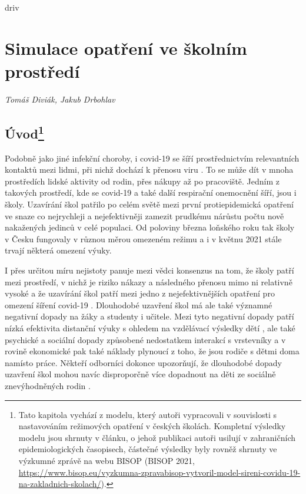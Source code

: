 driv
\chapter{Simulace opatření ve školním prostředí}\label{Skoly}

\textit{Tomáš Diviák, Jakub Drbohlav}
\vspace{15mm}

\section*{Úvod\footnote{Tato kapitola vychází z modelu, který autoři vypracovali v souvislosti s nastavováním režimových opatření v českých školách. Kompletní výsledky modelu jsou shrnuty v článku, o jehož publikaci autoři usilují v zahraničních epidemiologických časopisech, částečné výsledky byly rovněž shrnuty ve výzkumné zprávě na webu BISOP (BISOP 2021, \url{https://www.bisop.eu/vyzkumna-zpravabisop-vytvoril-model-sireni-covidu-19-na-zakladnich-skolach/}).}}

Podobně jako jiné infekční choroby, i covid-19 se šíří prostřednictvím relevantních kontaktů mezi lidmi, při nichž dochází k přenosu viru \cite{pg:kucharski2020, vespignani2020modelling}. To se může dít v mnoha prostředích lidské aktivity od rodin, přes nákupy až po pracoviště. Jedním z takových prostředí, kde se covid-19 a také další respirační onemocnění šíří, jsou i školy. Uzavírání škol patřilo po celém světě mezi první protiepidemická opatření ve snaze co nejrychleji a nejefektivněji zamezit prudkému nárůstu počtu nově nakažených jedinců v celé populaci. Od poloviny března loňského roku tak školy v Česku fungovaly v různou měrou omezeném režimu a i v květnu 2021 stále trvají některá omezení výuky.

I přes určitou míru nejistoty panuje mezi vědci konsenzus na tom, že školy patří mezi prostředí, v nichž je riziko nákazy a následného přenosu mimo ni relativně vysoké a že uzavírání škol patří mezi jedno z nejefektivnějších opatření pro omezení šíření covid-19 \cite{Brauner_etal2020, lessler2021household, Haug_etal2020}. Dlouhodobé uzavření škol má ale také významné negativní dopady na žáky a studenty i učitele. Mezi tyto negativní dopady patří nízká efektivita distanční výuky s ohledem na vzdělávací výsledky dětí \cite{engzell2021learning}, ale také psychické a sociální dopady způsobené nedostatkem interakcí s vrstevníky \cite{bignardi2020longitudinal, ravens2021impact} a v rovině ekonomické pak také náklady plynoucí z toho, že jsou rodiče s dětmi doma namísto práce. Někteří odborníci dokonce upozorňují, že dlouhodobé dopady uzavření škol mohou navíc disproporčně více dopadnout na děti ze sociálně znevýhodněných rodin \cite{di2020likely}.

